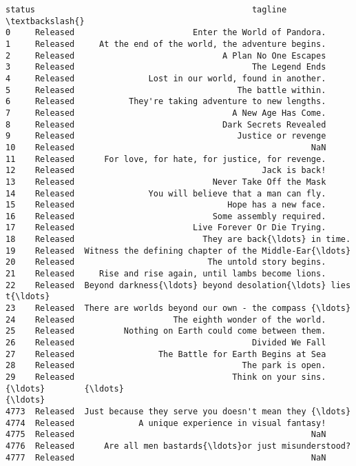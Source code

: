 \documentclass[11pt]{article}
\begin{document}
\begin{Verbatim}[commandchars=\\\{\}]
        status                                            tagline  \textbackslash{}
0     Released                        Enter the World of Pandora.   
1     Released     At the end of the world, the adventure begins.   
2     Released                              A Plan No One Escapes   
3     Released                                    The Legend Ends   
4     Released               Lost in our world, found in another.   
5     Released                                 The battle within.   
6     Released           They're taking adventure to new lengths.   
7     Released                                A New Age Has Come.   
8     Released                              Dark Secrets Revealed   
9     Released                                 Justice or revenge   
10    Released                                                NaN   
11    Released      For love, for hate, for justice, for revenge.   
12    Released                                      Jack is back!   
13    Released                            Never Take Off the Mask   
14    Released               You will believe that a man can fly.   
15    Released                               Hope has a new face.   
16    Released                            Some assembly required.   
17    Released                        Live Forever Or Die Trying.   
18    Released                          They are back{\ldots} in time.   
19    Released  Witness the defining chapter of the Middle-Ear{\ldots}   
20    Released                           The untold story begins.   
21    Released     Rise and rise again, until lambs become lions.   
22    Released  Beyond darkness{\ldots} beyond desolation{\ldots} lies t{\ldots}   
23    Released  There are worlds beyond our own - the compass {\ldots}   
24    Released                    The eighth wonder of the world.   
25    Released          Nothing on Earth could come between them.   
26    Released                                    Divided We Fall   
27    Released                 The Battle for Earth Begins at Sea   
28    Released                                  The park is open.   
29    Released                                Think on your sins.   
{\ldots}        {\ldots}                                                {\ldots}   
4773  Released  Just because they serve you doesn't mean they {\ldots}   
4774  Released             A unique experience in visual fantasy!   
4775  Released                                                NaN   
4776  Released      Are all men bastards{\ldots}or just misunderstood?   
4777  Released                                                NaN   

\end{Verbatim}
\end{document}
